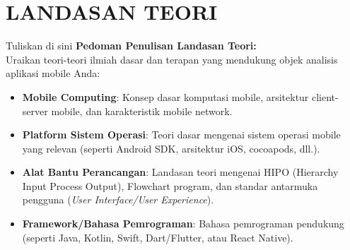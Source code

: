 \chapter{LANDASAN TEORI}


Tuliskan di sini \textbf{Pedoman Penulisan Landasan Teori:} \\
Uraikan teori-teori ilmiah dasar dan terapan yang mendukung objek analisis aplikasi mobile Anda:
\begin{itemize}
    \item \textbf{Mobile Computing}: Konsep dasar komputasi mobile, arsitektur client-server mobile, dan karakteristik mobile network.
    \item \textbf{Platform Sistem Operasi}: Teori dasar mengenai sistem operasi mobile yang relevan (seperti Android SDK, arsitektur iOS, cocoapods, dll.).
    \item \textbf{Alat Bantu Perancangan}: Landasan teori mengenai HIPO (Hierarchy Input Process Output), Flowchart program, dan standar antarmuka pengguna (\textit{User Interface/User Experience}).
    \item \textbf{Framework/Bahasa Pemrograman}: Bahasa pemrograman pendukung (seperti Java, Kotlin, Swift, Dart/Flutter, atau React Native).
\end{itemize}

